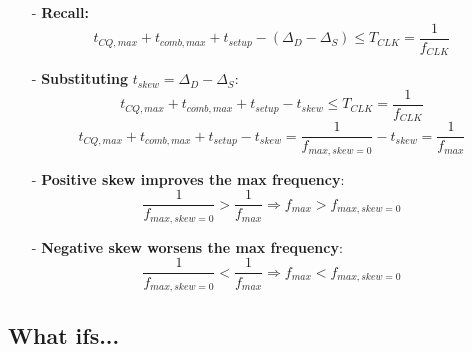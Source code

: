 \documentclass[12pt,openany]{book}
\begin{document}
\begin{itemize}
    \item[-] \textbf{Recall:}
    \[
    t_{CQ,max} + t_{comb,max} + t_{setup} - (\Delta_D - \Delta_S) \leq T_{CLK} = \frac{1}{f_{CLK}}
    \]
    \item[-] \textbf{Substituting} $t_{skew} = \Delta_D - \Delta_S$:
    \[
    t_{CQ,max} + t_{comb,max} + t_{setup} - t_{skew} \leq T_{CLK} = \frac{1}{f_{CLK}}
    \]
    \[
    t_{CQ,max} + t_{comb,max} + t_{setup} - t_{skew} = \frac{1}{f_{max,skew=0}} - t_{skew} = \frac{1}{f_{max}}
    \]
    \item[-] \textbf{Positive skew improves the max frequency}:
    \[
    \frac{1}{f_{max,skew=0}} > \frac{1}{f_{max}} \Rightarrow f_{max} > f_{max,skew=0}
    \]
    \item[-] \textbf{Negative skew worsens the max frequency}:
    \[
    \frac{1}{f_{max,skew=0}} < \frac{1}{f_{max}} \Rightarrow f_{max} < f_{max,skew=0}
    \]
\end{itemize}


\subsection*{What ifs...}
\end{document}
